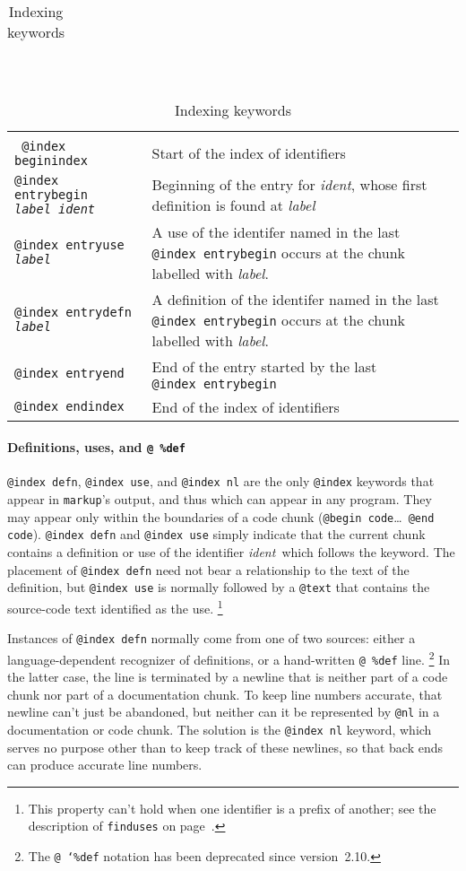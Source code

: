 \documentclass{article}
\makeatletter
\newcommand\kw[1]{\texttt{@#1}}
\newcommand\kws[2]{\kw{#1}\hbox{\thinspace}\ldots~\kw{#2}}
\newcommand\ikw[1]{\kw{index~#1}}
\newcommand\ltxlabel{\relax}
\let\ltxlabel=\label
\renewcommand\label{{\rm\it label\/}}
\newcommand\ident{{\rm\it ident\/}}
\newcommand\ttitle[1]{\noalign{\medskip}\multicolumn{2}{c}{#1}\\\noalign{\smallskip}}
\makeatother
\begin{document}
\begin{table}
\begin{center}
\begin{tabularx}{\textwidth}{|>{\tt}l>{\raggedright\arraybackslash}X|}
\hline
\end{tabularx}\\
\begin{tabularx}{\textwidth}{|>{\tt}l>{\raggedright\arraybackslash}X|}
\ttitle{The index of identifiers}
\hline
@index beginindex&Start of the index of identifiers\\
@index entrybegin \label\ \ident&
        Beginning of the entry for \ident, whose first definition is
        found at \label\\
@index entryuse \label&
        A use of the identifer named in the last \ikw{entrybegin}
        occurs at the chunk labelled with \label.\\
@index entrydefn \label&
        A definition of the identifer named in the last \ikw{entrybegin}
        occurs at the chunk labelled with \label.\\
@index entryend&
        End of the entry started by the last \ikw{entrybegin}\\
@index endindex&End of the index of identifiers\\
\hline
\end{tabularx}
\end{center}
\caption{Indexing keywords}
\ltxlabel{tab:index}
\vskip -5pt
\end{table}



\paragraph{Definitions, uses, and {\tt @ \%def}}

\ikw{defn}, \ikw{use}, and \ikw{nl} are the only
\kw{index} keywords that appear in {\tt markup}'s output, and thus
which can appear in any program.
They may appear only within the boundaries of a code chunk (\kws{begin
code}{end code}).
\ikw{defn} and \ikw{use} simply indicate that the current chunk
contains a definition or use of the identifier \ident\ which follows
the keyword.
The placement of \ikw{defn} need not bear a relationship to the
text of the definition, but \ikw{use} is normally followed by a
\kw{text} that contains the source-code text identified as the
use.%
\footnote{This property can't hold when one identifier is a prefix of
another; see the description of {\tt finduses} on page~\pageref{finduses}.}

Instances of \ikw{defn} normally come from one of two sources: either a
language-dependent recognizer of definitions, or a hand-written
\verb+@ %def+ line.%
\footnote{The \texttt{@ \char`\%def} notation has been deprecated
since version~2.10.}
In the latter case, the line is terminated by a newline that is
neither part of a code chunk nor part of a documentation chunk.
To keep line numbers accurate, that newline can't just be abandoned,
but neither can it be represented by \kw{nl} in a documentation or
code chunk.
The solution is the \ikw{nl} keyword, which serves no purpose other
than to keep track of these newlines, so that back ends can produce
accurate line numbers.
\end{document}
